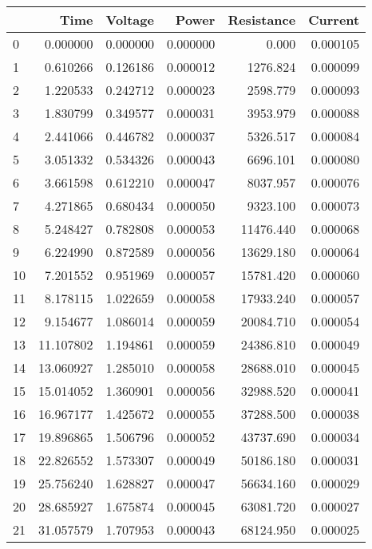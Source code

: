 \begin{tabular}{lrrrrr}
\toprule
{} &         Time &   Voltage &     Power &   Resistance &   Current \\
\midrule
0  &     0.000000 &  0.000000 &  0.000000 &        0.000 &  0.000105 \\
1  &     0.610266 &  0.126186 &  0.000012 &     1276.824 &  0.000099 \\
2  &     1.220533 &  0.242712 &  0.000023 &     2598.779 &  0.000093 \\
3  &     1.830799 &  0.349577 &  0.000031 &     3953.979 &  0.000088 \\
4  &     2.441066 &  0.446782 &  0.000037 &     5326.517 &  0.000084 \\
5  &     3.051332 &  0.534326 &  0.000043 &     6696.101 &  0.000080 \\
6  &     3.661598 &  0.612210 &  0.000047 &     8037.957 &  0.000076 \\
7  &     4.271865 &  0.680434 &  0.000050 &     9323.100 &  0.000073 \\
8  &     5.248427 &  0.782808 &  0.000053 &    11476.440 &  0.000068 \\
9  &     6.224990 &  0.872589 &  0.000056 &    13629.180 &  0.000064 \\
10 &     7.201552 &  0.951969 &  0.000057 &    15781.420 &  0.000060 \\
11 &     8.178115 &  1.022659 &  0.000058 &    17933.240 &  0.000057 \\
12 &     9.154677 &  1.086014 &  0.000059 &    20084.710 &  0.000054 \\
13 &    11.107802 &  1.194861 &  0.000059 &    24386.810 &  0.000049 \\
14 &    13.060927 &  1.285010 &  0.000058 &    28688.010 &  0.000045 \\
15 &    15.014052 &  1.360901 &  0.000056 &    32988.520 &  0.000041 \\
16 &    16.967177 &  1.425672 &  0.000055 &    37288.500 &  0.000038 \\
17 &    19.896865 &  1.506796 &  0.000052 &    43737.690 &  0.000034 \\
18 &    22.826552 &  1.573307 &  0.000049 &    50186.180 &  0.000031 \\
19 &    25.756240 &  1.628827 &  0.000047 &    56634.160 &  0.000029 \\
20 &    28.685927 &  1.675874 &  0.000045 &    63081.720 &  0.000027 \\
21 &    31.057579 &  1.707953 &  0.000043 &    68124.950 &  0.000025 \\

\end{tabular}
